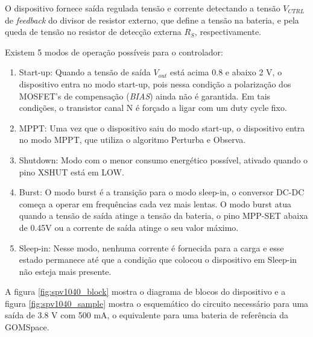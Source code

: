 O dispositivo fornece saída regulada
tensão e corrente detectando a tensão $V_{CTRL}$ de \textit{feedback} do divisor de resistor externo, que define a tensão na bateria, e pela queda de tensão no resistor de detecção externa $R_{S}$, respectivamente.

Existem 5 modos de operação possíveis para o controlador:
\begin{enumerate}
    \item Start-up: Quando a tensão de saída $V_{out}$ está acima 0.8 e abaixo 2 V, o dispositivo entra no modo start-up, pois nessa condição a polarização dos MOSFET's de compensação (\textit{BIAS}) ainda não é garantida. Em tais condições, o transistor canal N é forçado a ligar com um duty cycle fixo.
    \item MPPT: Uma vez que o dispositivo saiu do modo start-up, o dispositivo entra no modo MPPT, que utiliza o algoritmo Perturba e Observa.
    \item Shutdown: Modo com o menor consumo energético possível, ativado quando o pino XSHUT está em LOW.
    \item Burst: O modo burst é a transição para o modo sleep-in, o conversor DC-DC começa a operar em frequências cada vez mais lentas. O modo burst atua quando a tensão de saída atinge a tensão da bateria, o pino MPP-SET abaixa de 0.45V ou a corrente de saída atinge o seu valor máximo.
    \item Sleep-in: Nesse modo, nenhuma corrente é fornecida para a carga e esse estado permanece até que a condição que colocou o dispositivo em Sleep-in não esteja mais presente.
\end{enumerate}

A figura \ref{fig:spv1040_block} mostra o diagrama de blocos do dispositivo e a figura \ref{fig:spv1040_sample} mostra o esquemático do circuito necessário para uma saída de 3.8 V com 500 mA, o equivalente para uma bateria de referência da GOMSpace.

\noindent
\begin{minipage}{\linewidth}
\label{fig:spv1040_block}
\end{minipage}

